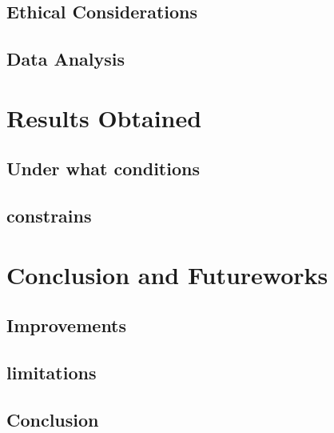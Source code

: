 \documentclass{article}
\begin{document}
\subsection{Ethical Considerations}
\subsection{Data Analysis}



\newpage
\section{Results Obtained}
\subsection{Under what conditions}
\subsection{constrains}

\newpage
\section{Conclusion and Futureworks}
\subsection{Improvements}
\subsection{limitations}
\subsection{Conclusion}



\newpage
\end{document}
